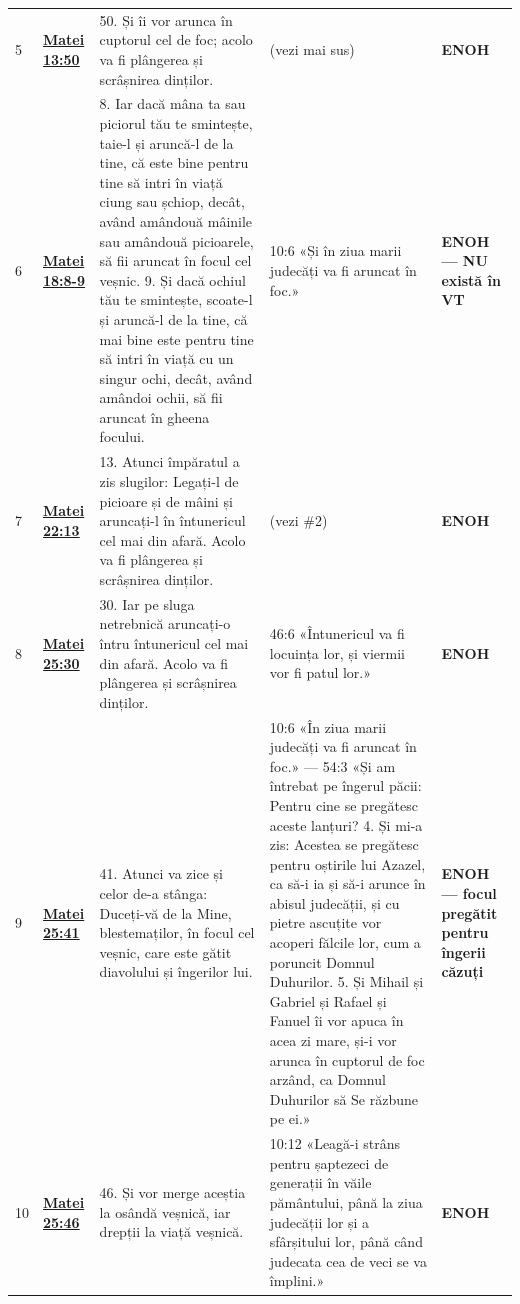 \documentclass[12pt,a4paper,twoside,openany]{book}
\begin{document}
\begin{longtable}{L{0.7cm}L{0.7cm}L{5.2cm}L{7.1cm}L{0.7cm}}
5 & \href{https://bibliaortodoxa.ro/carte.php?id=55\&cap=13\#50}{\textbf{Matei 13:50}} & 50. Și îi vor arunca în cuptorul cel de foc; acolo va fi plângerea și scrâșnirea dinților. & (vezi mai sus) & \textbf{ENOH} \\
6 & \href{https://bibliaortodoxa.ro/carte.php?id=55\&cap=18\#8}{\textbf{Matei 18:8-9}} & 8. Iar dacă mâna ta sau piciorul tău te smintește, taie-l și aruncă-l de la tine, că este bine pentru tine să intri în viață ciung sau șchiop, decât, având amândouă mâinile sau amândouă picioarele, să fii aruncat în focul cel veșnic. 9. Și dacă ochiul tău te smintește, scoate-l și aruncă-l de la tine, că mai bine  este pentru tine să intri în viață cu un singur ochi, decât, având amândoi ochii, să fii aruncat în gheena focului. & 10:6 «Și în ziua marii judecăți va fi aruncat în foc.» & \textbf{ENOH — NU există în VT} \\
7 & \href{https://bibliaortodoxa.ro/carte.php?id=55\&cap=22\#13}{\textbf{Matei 22:13}} & 13. Atunci împăratul a zis slugilor: Legați-l de picioare și de mâini și aruncați-l în întunericul cel mai din afară. Acolo va fi plângerea și scrâșnirea dinților. & (vezi \#2) & \textbf{ENOH} \\
8 & \href{https://bibliaortodoxa.ro/carte.php?id=55\&cap=25\#30}{\textbf{Matei 25:30}} & 30. Iar pe sluga netrebnică aruncați-o întru întunericul cel mai din afară. Acolo va fi plângerea și scrâșnirea dinților. & 46:6 «Întunericul va fi locuința lor, și viermii vor fi patul lor.» & \textbf{ENOH} \\
9 & \href{https://bibliaortodoxa.ro/carte.php?id=55\&cap=25\#41}{\textbf{Matei 25:41}} & 41. Atunci va zice și celor de-a stânga: Duceți-vă de la Mine, blestemaților, în focul cel veșnic, care este gătit diavolului și îngerilor lui. & 10:6 «În ziua marii judecăți va fi aruncat în foc.» — 54:3 «Și am întrebat pe îngerul păcii: Pentru cine se pregătesc aceste lanțuri? 4. Și mi-a zis: Acestea se pregătesc pentru oștirile lui Azazel, ca să-i ia și să-i arunce în abisul judecății, și cu pietre ascuțite vor acoperi fălcile lor, cum a poruncit Domnul Duhurilor. 5. Și Mihail și Gabriel și Rafael și Fanuel îi vor apuca în acea zi mare, și-i vor arunca în cuptorul de foc arzând, ca Domnul Duhurilor să Se răzbune pe ei.» & \textbf{ENOH — focul pregătit pentru îngerii căzuți} \\
10 & \href{https://bibliaortodoxa.ro/carte.php?id=55\&cap=25\#46}{\textbf{Matei 25:46}} & 46. Și vor merge aceștia la osândă veșnică, iar drepții la viață veșnică. & 10:12 «Leagă-i strâns pentru șaptezeci de generații în văile pământului, până la ziua judecății lor și a sfârșitului lor, până când judecata cea de veci se va împlini.» & \textbf{ENOH} \\

\end{longtable}
\end{document}

